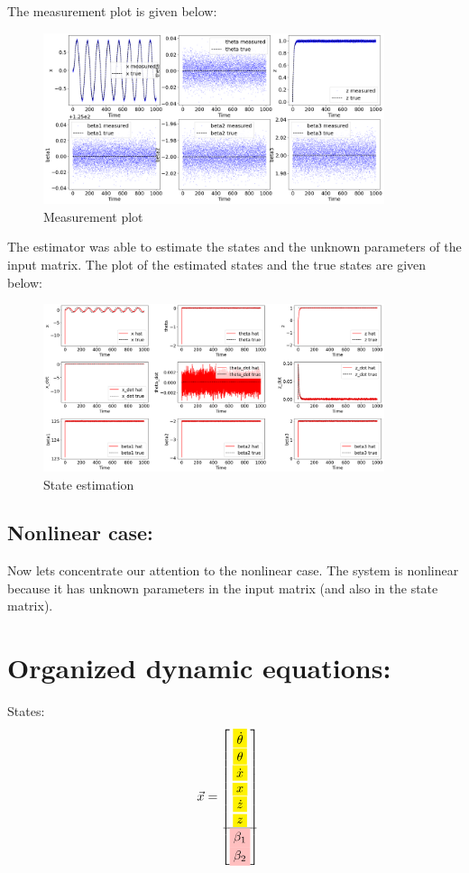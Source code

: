 \documentclass[12pt]{article}
\begin{document}
The measurement plot is given below:
\begin{figure}[h!]
    \centering
    \includegraphics[width=10cm]{figures/phase_02_measurement1.png}
    \caption{Measurement plot}
    \label{fig:02}
\end{figure}
The estimator was able to estimate the states and the unknown parameters of the input matrix. The plot of the estimated states and the true states are given below:
\begin{figure}[h!]
    \centering
    \includegraphics[width=10cm]{figures/phase_02_states1.png}
    \caption{State estimation}
    \label{fig:03}
\end{figure}

\subsection*{Nonlinear case:}
Now lets concentrate our attention to the nonlinear case. The system is nonlinear because it has unknown parameters in the input matrix (and also in the state matrix).  

\section*{Organized dynamic equations:}

States:
\begin{align*}
    \vec{x} &= \begin{bmatrix}
        \colorbox{yellow}{$\dot{\theta}$} \\
        \colorbox{yellow}{$\theta$} \\
        \colorbox{yellow}{$\dot{x}$} \\
        \colorbox{yellow}{$x$} \\
        \colorbox{yellow}{$\dot{z}$} \\
        \colorbox{yellow}{$z$} \\
        \hline
        \colorbox{pink}{$\beta_1$} \\
        \colorbox{pink}{$\beta_2$} \\
    \end{bmatrix}
\end{align*}
\end{document}
